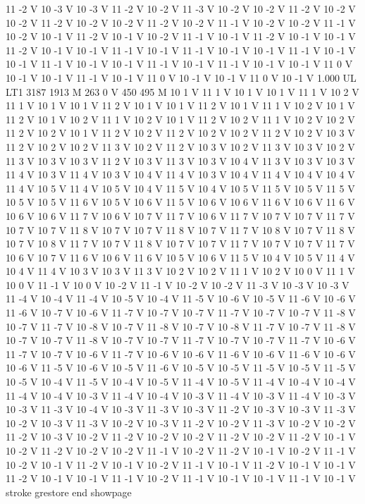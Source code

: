 {11 -2 V
10 -3 V
10 -3 V
11 -2 V
10 -2 V
11 -3 V
10 -2 V
10 -2 V
11 -2 V
10 -2 V
10 -2 V
11 -2 V
10 -2 V
10 -2 V
11 -2 V
10 -2 V
11 -1 V
10 -2 V
10 -2 V
11 -1 V
10 -2 V
10 -1 V
11 -2 V
10 -1 V
10 -2 V
11 -1 V
10 -1 V
11 -2 V
10 -1 V
10 -1 V
11 -2 V
10 -1 V
10 -1 V
11 -1 V
10 -1 V
11 -1 V
10 -1 V
10 -1 V
11 -1 V
10 -1 V
10 -1 V
11 -1 V
10 -1 V
10 -1 V
11 -1 V
10 -1 V
11 -1 V
10 -1 V
10 -1 V
11 0 V
10 -1 V
10 -1 V
11 -1 V
10 -1 V
11 0 V
10 -1 V
10 -1 V
11 0 V
10 -1 V
1.000 UL
LT1
3187 1913 M
263 0 V
450 495 M
10 1 V
11 1 V
10 1 V
10 1 V
11 1 V
10 2 V
11 1 V
10 1 V
10 1 V
11 2 V
10 1 V
10 1 V
11 2 V
10 1 V
11 1 V
10 2 V
10 1 V
11 2 V
10 1 V
10 2 V
11 1 V
10 2 V
10 1 V
11 2 V
10 2 V
11 1 V
10 2 V
10 2 V
11 2 V
10 2 V
10 1 V
11 2 V
10 2 V
11 2 V
10 2 V
10 2 V
11 2 V
10 2 V
10 3 V
11 2 V
10 2 V
10 2 V
11 3 V
10 2 V
11 2 V
10 3 V
10 2 V
11 3 V
10 3 V
10 2 V
11 3 V
10 3 V
10 3 V
11 2 V
10 3 V
11 3 V
10 3 V
10 4 V
11 3 V
10 3 V
10 3 V
11 4 V
10 3 V
11 4 V
10 3 V
10 4 V
11 4 V
10 3 V
10 4 V
11 4 V
10 4 V
10 4 V
11 4 V
10 5 V
11 4 V
10 5 V
10 4 V
11 5 V
10 4 V
10 5 V
11 5 V
10 5 V
11 5 V
10 5 V
10 5 V
11 6 V
10 5 V
10 6 V
11 5 V
10 6 V
10 6 V
11 6 V
10 6 V
11 6 V
10 6 V
10 6 V
11 7 V
10 6 V
10 7 V
11 7 V
10 6 V
11 7 V
10 7 V
10 7 V
11 7 V
10 7 V
10 7 V
11 8 V
10 7 V
10 7 V
11 8 V
10 7 V
11 7 V
10 8 V
10 7 V
11 8 V
10 7 V
10 8 V
11 7 V
10 7 V
11 8 V
10 7 V
10 7 V
11 7 V
10 7 V
10 7 V
11 7 V
10 6 V
10 7 V
11 6 V
10 6 V
11 6 V
10 5 V
10 6 V
11 5 V
10 4 V
10 5 V
11 4 V
10 4 V
11 4 V
10 3 V
10 3 V
11 3 V
10 2 V
10 2 V
11 1 V
10 2 V
10 0 V
11 1 V
10 0 V
11 -1 V
10 0 V
10 -2 V
11 -1 V
10 -2 V
10 -2 V
11 -3 V
10 -3 V
10 -3 V
11 -4 V
10 -4 V
11 -4 V
10 -5 V
10 -4 V
11 -5 V
10 -6 V
10 -5 V
11 -6 V
10 -6 V
11 -6 V
10 -7 V
10 -6 V
11 -7 V
10 -7 V
10 -7 V
11 -7 V
10 -7 V
10 -7 V
11 -8 V
10 -7 V
11 -7 V
10 -8 V
10 -7 V
11 -8 V
10 -7 V
10 -8 V
11 -7 V
10 -7 V
11 -8 V
10 -7 V
10 -7 V
11 -8 V
10 -7 V
10 -7 V
11 -7 V
10 -7 V
10 -7 V
11 -7 V
10 -6 V
11 -7 V
10 -7 V
10 -6 V
11 -7 V
10 -6 V
10 -6 V
11 -6 V
10 -6 V
11 -6 V
10 -6 V
10 -6 V
11 -5 V
10 -6 V
10 -5 V
11 -6 V
10 -5 V
10 -5 V
11 -5 V
10 -5 V
11 -5 V
10 -5 V
10 -4 V
11 -5 V
10 -4 V
10 -5 V
11 -4 V
10 -5 V
11 -4 V
10 -4 V
10 -4 V
11 -4 V
10 -4 V
10 -3 V
11 -4 V
10 -4 V
10 -3 V
11 -4 V
10 -3 V
11 -4 V
10 -3 V
10 -3 V
11 -3 V
10 -4 V
10 -3 V
11 -3 V
10 -3 V
11 -2 V
10 -3 V
10 -3 V
11 -3 V
10 -2 V
10 -3 V
11 -3 V
10 -2 V
10 -3 V
11 -2 V
10 -2 V
11 -3 V
10 -2 V
10 -2 V
11 -2 V
10 -3 V
10 -2 V
11 -2 V
10 -2 V
10 -2 V
11 -2 V
10 -2 V
11 -2 V
10 -1 V
10 -2 V
11 -2 V
10 -2 V
10 -2 V
11 -1 V
10 -2 V
11 -2 V
10 -1 V
10 -2 V
11 -1 V
10 -2 V
10 -1 V
11 -2 V
10 -1 V
10 -2 V
11 -1 V
10 -1 V
11 -2 V
10 -1 V
10 -1 V
11 -2 V
10 -1 V
10 -1 V
11 -1 V
10 -2 V
11 -1 V
10 -1 V
10 -1 V
11 -1 V
10 -1 V
stroke
grestore
end
showpage
}
